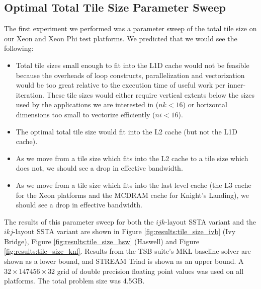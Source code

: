 \documentclass{sig-alternate-05-2015}
\begin{document}
\subsection{Optimal Total Tile Size Parameter Sweep}
\label{sec:results:tile_size_sweep}

The first experiment we performed was a parameter sweep of the total tile size
  on our Xeon and Xeon Phi test platforms.
We predicted that we would see the following: 
\begin{itemize}
\item Total tile sizes small enough to fit into the L1D cache would not be feasible
  because the overheads of loop constructs, parallelization and vectorization
  would be too great relative to the execution time of useful work per
  inner-iteration.
These tile sizes would either require vertical extents below the sizes used
  by the applications we are interested in (\(nk < 16\)) or horizontal
  dimensions too small to vectorize efficiently (\(ni < 16\)).
\item The optimal total tile size would fit into the L2 cache (but not the L1D
  cache).
\item As we move from a tile size which fits into the L2 cache to a tile size
  which does not, we should see a drop in effective bandwidth.
\item As we move from a tile size which fits into the last level cache (the L3
  cache for the Xeon platforms and the MCDRAM cache for Knight's Landing), we
  should see a drop in effective bandwidth.
\end{itemize}

The results of this parameter sweep for both the \(ijk\)-layout SSTA variant and
  the \(ikj\)-layout SSTA variant are shown in Figure
  \ref{fig:results:tile_size_ivb} (Ivy Bridge), Figure
  \ref{fig:results:tile_size_hsw} (Haswell) and Figure
  \ref{fig:results:tile_size_knl}.
Results from the TSB suite's MKL baseline solver are shown as a lower bound,
  and STREAM Triad is shown as an upper bound. 
A \(32 \times 147456 \times 32\) grid of double precision floating point values
  was used on all platforms.
The total problem size was 4.5GB.

\end{document}
